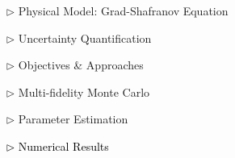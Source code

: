 \documentclass{beamer}
\begin{document}
\begin{frame}[c]
\large 	
\textcolor{mygray1}{
    \begin{itemize}[leftmargin=5pt] 
        \item[$\triangleright$]  Physical Model: Grad-Shafranov Equation
        \vspace{0.2cm}	
        \item[$\triangleright$] Uncertainty Quantification
        \vspace{0.2cm}
        \item[$\triangleright$] Objectives \& Approaches
        \vspace{0.2cm}
        \item[$\triangleright$]  Multi-fidelity Monte Carlo
        \vspace{0.2cm}
        \item[$\triangleright$] Parameter Estimation
        \vspace{0.2cm}
        \item[\textcolor{black}{$\triangleright$}] \textcolor{black}{\fontsize{25}{60}\selectfont Numerical Results}
    \end{itemize}
}
\end{frame}
\end{document}
